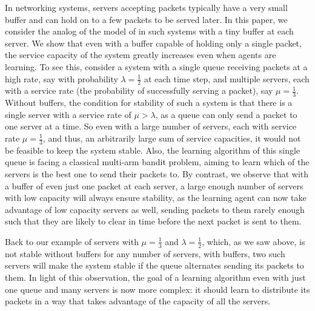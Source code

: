 In networking systems, servers accepting packets typically have a very small buffer and can hold on to a few packets to be served later. In this paper, we consider the analog of the model of  \cite{DBLP:conf/sigecom/GaitondeT20,DBLP:journals/jacm/GaitondeT23} in such systems with a tiny buffer at each server. We show that even with a buffer capable of holding only a single packet, the service capacity of the system greatly increases even when agents are learning.  To see this, consider a system with 
a single queue receiving packets at a high rate, say with probability 
$\lambda=\frac12$ at each time step, and multiple servers, each with a service rate (the probability of successfully serving a packet), say
$\mu=\frac13$. Without buffers, the condition for stability of such a system is that there is a single server with a service rate of $\mu>\lambda$, as a queue can only send a packet to one server at a time.  So even with a large number of servers, each with service rate $\mu=\frac13$, and thus, an arbitrarily large sum of service capacities, it would not be feasible to keep the system stable.
Also, the learning algorithm of this  single queue is facing a classical multi-arm bandit problem, aiming to learn which of the servers is the best one to send their packets to. By contrast, we observe that with a buffer of even just one packet at each server, a large enough number of servers with low capacity will always ensure stability, as the 
learning agent can now take advantage of low capacity servers as well, sending packets to them rarely enough 
such that they are likely to clear in time before the next packet is sent to them.

Back to our example of servers with $\mu=\frac13$ and $\lambda = \frac{1}{2}$, which, as we saw above, is not stable without buffers for any number of servers, with buffers, two such servers will make the system stable if the queue alternates sending its packets to them. In light of this observation, the goal of a learning algorithm even with just one queue and many servers is now more complex: it should learn to distribute its packets in a way that takes advantage of the capacity of all the servers.

